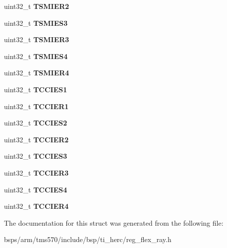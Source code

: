 \begin{DoxyCompactItemize}
uint32\+\_\+t {\bfseries T\+S\+M\+I\+E\+R2}
\item 
\mbox{\label{structtms570__flex__ray__t_a734c95af6346c2a4ac3ba4bb7472cffb}} 
uint32\+\_\+t {\bfseries T\+S\+M\+I\+E\+S3}
\item 
\mbox{\label{structtms570__flex__ray__t_aec9004dde1be66eef8c75881c1c094f9}} 
uint32\+\_\+t {\bfseries T\+S\+M\+I\+E\+R3}
\item 
\mbox{\label{structtms570__flex__ray__t_a30ed7b9d58ba671dbe14a27e15ed7238}} 
uint32\+\_\+t {\bfseries T\+S\+M\+I\+E\+S4}
\item 
\mbox{\label{structtms570__flex__ray__t_a6119b791932885ee975d4b7df7952ec2}} 
uint32\+\_\+t {\bfseries T\+S\+M\+I\+E\+R4}
\item 
\mbox{\label{structtms570__flex__ray__t_af6facb63b8d95e7d51b0941c83fa5cb3}} 
uint32\+\_\+t {\bfseries T\+C\+C\+I\+E\+S1}
\item 
\mbox{\label{structtms570__flex__ray__t_afdc16bb247392502e0b4e1aec9bf3725}} 
uint32\+\_\+t {\bfseries T\+C\+C\+I\+E\+R1}
\item 
\mbox{\label{structtms570__flex__ray__t_ac1bf5d3f508bfb6a1e02845042c38374}} 
uint32\+\_\+t {\bfseries T\+C\+C\+I\+E\+S2}
\item 
\mbox{\label{structtms570__flex__ray__t_a29f7077b1643738708ecd695a38ea2c1}} 
uint32\+\_\+t {\bfseries T\+C\+C\+I\+E\+R2}
\item 
\mbox{\label{structtms570__flex__ray__t_a1d168de9caaca58b95fd3b4db9b9410e}} 
uint32\+\_\+t {\bfseries T\+C\+C\+I\+E\+S3}
\item 
\mbox{\label{structtms570__flex__ray__t_ad96764502003ed514c6a90591a005b72}} 
uint32\+\_\+t {\bfseries T\+C\+C\+I\+E\+R3}
\item 
\mbox{\label{structtms570__flex__ray__t_a251036f7af0d580c4da4d22a74a4cf28}} 
uint32\+\_\+t {\bfseries T\+C\+C\+I\+E\+S4}
\item 
\mbox{\label{structtms570__flex__ray__t_a6519d224eaa6fb5a8fccb1704424e0c4}} 
uint32\+\_\+t {\bfseries T\+C\+C\+I\+E\+R4}
\end{DoxyCompactItemize}


The documentation for this struct was generated from the following file\+:\begin{DoxyCompactItemize}
\item 
bsps/arm/tms570/include/bsp/ti\+\_\+herc/reg\+\_\+flex\+\_\+ray.\+h\end{DoxyCompactItemize}
